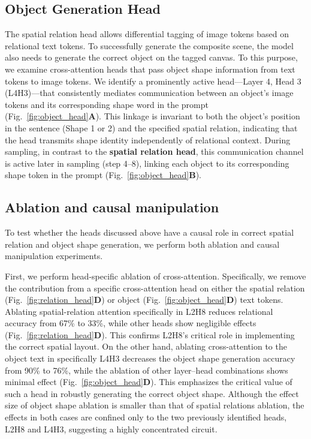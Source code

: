 \subsection{Object Generation Head}
The spatial relation head allows differential tagging of image tokens based on relational text tokens. To successfully generate the composite scene, the model also needs to generate the correct object on the tagged canvas. To this purpose, we examine cross-attention heads that pass object shape information from text tokens to image tokens. We identify a prominently active head---Layer 4, Head 3 (L4H3)---that consistently mediates communication between an object's image tokens and its corresponding shape word in the prompt (Fig.~\ref{fig:object_head}\textbf{A}). This linkage is invariant to both the object's position in the sentence (Shape 1 or 2) and the specified spatial relation, indicating that the head transmits shape identity independently of relational context.
During sampling, in contrast to the \textbf{spatial relation head}, this communication channel is active later in sampling (step 4--8), linking each object to its corresponding shape token in the prompt (Fig.~\ref{fig:object_head}\textbf{B}).

\subsection{Ablation and causal manipulation}
To test whether the heads discussed above have a causal role in correct spatial relation and object shape generation, we perform both ablation and causal manipulation experiments.

First, we perform head-specific ablation of cross-attention. Specifically, we remove the contribution from a specific cross-attention head on either the spatial relation (Fig.~\ref{fig:relation_head}\textbf{D}) or object (Fig.~\ref{fig:object_head}\textbf{D}) text tokens. Ablating spatial-relation attention specifically in L2H8 reduces relational accuracy from 67\% to 33\%, while other heads show negligible effects (Fig.~\ref{fig:relation_head}\textbf{D}).
This confirms L2H8's critical role in implementing the correct spatial layout. On the other hand, ablating cross-attention to the object text in specifically L4H3 decreases the object shape generation accuracy from 90\% to 76\%, while the ablation of other layer--head combinations shows minimal effect (Fig.~\ref{fig:object_head}\textbf{D}). This emphasizes the critical value of such a head in robustly generating the correct object shape. Although the effect size of object shape ablation is smaller than that of spatial relations ablation, the effects in both cases are confined only to the two previously identified heads, L2H8 and L4H3, suggesting a highly concentrated circuit.

